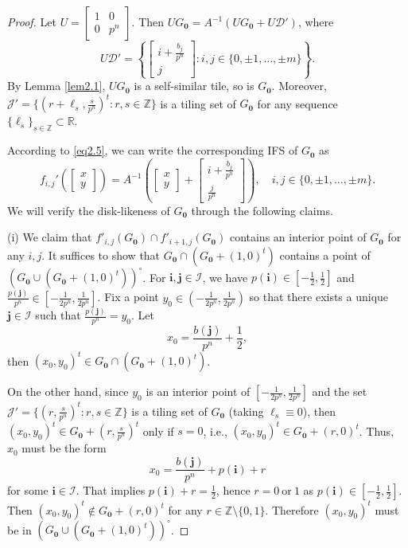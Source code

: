 \documentclass[12pt, reqno]{amsart}
\numberwithin{equation}{section}
\begin{document}
\begin{proof}
Let  $U=\left[\begin{array}{cc}
1& 0 \\
0 & p^n
\end{array}\right]$. Then $UG_{\mathbf 0}=A^{-1}(UG_{\mathbf 0}+U{\mathcal D}')$, where $$U{\mathcal D}'=\left\{\left[\begin{array}{c}i+\frac{b_j}{p^n}\\j\end{array}\right]: i,j\in\{0,\pm1,\dots,\pm m\}\right\}.$$ 
By Lemma \ref{lem2.1}, $UG_{\mathbf 0}$ is a self-similar tile, so is $G_{\mathbf 0}$. Moreover,  ${\mathcal J}'=\{(r+\ell_s,\frac{s}{p^n})^t: r,s\in\mathbb{Z}\}$ is a tiling set of $G_{\mathbf 0}$ for any sequence $\{\ell_s\}_{s\in\mathbb{Z}}\subset\mathbb{R}$.

According to \eqref{eq2.5}, we can write the corresponding IFS of $G_{\mathbf 0}$ as 
$$f_{i,j}'\left(\left[\begin{array}{c}x\\y\end{array}\right]\right)=A^{-1}\left(\left[\begin{array}{c}x\\y\end{array}\right]+\left[\begin{array}{c}i+\frac{b_j}{p^n}\\ \frac{j}{p^n}\end{array}\right]\right),\quad i,j\in\{0,\pm1,\dots,\pm m\}.$$
We will verify the disk-likeness of $G_{\mathbf 0}$ through the following claims.

(i) We claim that $f'_{i,j}(G_{\mathbf 0})\cap f'_{i+1,j}(G_{\mathbf 0})$ contains an interior point of $G_{\mathbf 0}$ for any $i,j$. It suffices to show that $G_{\mathbf 0}\cap (G_{\mathbf 0}+(1,0)^t)$ contains a point of $(G_{\mathbf 0}\cup (G_{\mathbf 0}+(1,0)^t))^\circ$. For ${\mathbf i}, {\mathbf j}\in {\mathcal I}$, we have $p(\mathbf i)\in [-\frac{1}{2},\frac{1}{2}]$ and $\frac{p(\mathbf j)}{p^n}\in [-\frac{1}{2p^n},\frac{1}{2p^n}]$. Fix a point $y_0\in(-\frac{1}{2p^n},\frac{1}{2p^n})$ so that there exists a unique $\mathbf j\in {\mathcal I}$ such that $\frac{p(\mathbf j)}{p^n}=y_0$. Let $$x_0=\frac{b(\mathbf j)}{p^n}+\frac{1}{2},$$ then $(x_0,y_0)^t\in G_{\mathbf 0}\cap (G_{\mathbf 0}+(1,0)^t)$.

On the other hand, since $y_0$ is an interior point of $[-\frac{1}{2p^n},\frac{1}{2p^n}]$ and the set ${\mathcal J}'=\{(r,\frac{s}{p^n})^t: r,s\in\mathbb{Z}\}$ is a tiling set of $G_{\mathbf 0}$ (taking $\ell_s\equiv0$), then $(x_0,y_0)^t\in G_{\mathbf 0}+(r,\frac{s}{p^n})^t$ only if $s=0$,  i.e., $(x_0,y_0)^t\in G_{\mathbf 0}+(r,0)^t$. Thus, $x_0$ must be the form
$$x_0=\frac{b(\mathbf j)}{p^n}+p(\mathbf i)+r$$
for some $\mathbf i\in {\mathcal I}$.  That implies $p(\mathbf i)+r=\frac{1}{2}$, hence $r=0\ \text{or}\ 1$ as $p(\mathbf i)\in [-\frac{1}{2},\frac{1}{2}]$. Then $(x_0,y_0)^t\notin G_{\mathbf 0}+(r,0)^t$ for any $r\in {\mathbb Z}\setminus\{0,1\}$. Therefore $(x_0,y_0)^t$ must be in $(G_{\mathbf 0}\cup (G_{\mathbf 0}+(1,0)^t))^\circ$.


\end{proof}
\end{document}
